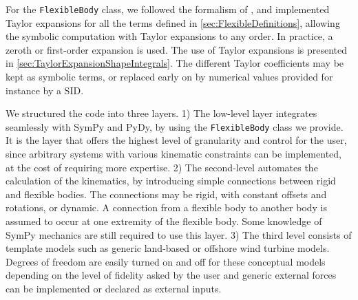 \documentclass[wes, manuscript]{copernicus}
\begin{document}
For the \texttt{FlexibleBody} class, we followed the formalism of \cite{Wallrapp:1994}, and implemented Taylor expansions for all the terms defined in \autoref{sec:FlexibleDefinitions}, allowing the symbolic computation with Taylor expansions to any order.
In practice, a zeroth or first-order expansion is used.
The use of Taylor expansions is presented in \autoref{sec:TaylorExpansionShapeIntegrals}. 
The different Taylor coefficients may be kept as symbolic terms, or replaced early on by numerical values provided for instance by a SID. 



We structured the code into three layers.
1) The low-level layer integrates seamlessly with SymPy and PyDy, by using the \texttt{FlexibleBody} class we provide.
It is the layer that offers the highest level of granularity and control for the user, since arbitrary systems with various kinematic constraints can be implemented, at the cost of requiring more expertise.
2) The second-level automates the calculation of the kinematics, by introducing simple connections between rigid and flexible bodies.
The connections may be rigid, with constant offsets and rotations, or dynamic.
A connection from a flexible body to another body is assumed to occur at one extremity of the flexible body.
Some knowledge of SymPy mechanics are still required to use this layer.
3) The third level consists of template models such as generic land-based or offshore wind turbine models.
Degrees of freedom are easily turned on and off for these conceptual models depending on the level of fidelity asked by the user and generic external forces can be implemented or declared as external inputs.
\end{document}
